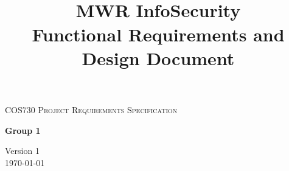 \begin{titlepage}
\begin{center}

\textsc{\LARGE COS730 Project Requirements Specification}

\textbf{Group 1} \\

\title{
  \textbf{\\}
MWR InfoSecurity\\
Functional Requirements and Design Document\\
}

\vfill

{\large Version 1}
\\
{\large \today}

\end{center}
\end{titlepage}
